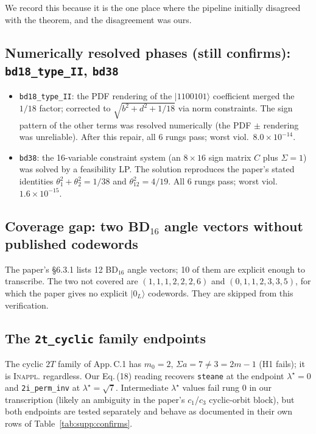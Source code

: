\documentclass[11pt]{article}
\newcommand{\vINAP}{\textcolor{cInapp}{\textsc{Inappl.}}}
\newcommand{\enot}[2]{\ensuremath{#1\!\times\!10^{#2}}}
\begin{document}
We record this because it is the one place where the pipeline initially
disagreed with the theorem, and the disagreement was ours.

\subsection{Numerically resolved phases (still confirms):
\texttt{bd18\_type\_II}, \texttt{bd38}}

\begin{itemize}[leftmargin=2em]
\item \texttt{bd18\_type\_II}: the PDF rendering of the $|1100101\rangle$
coefficient merged the $1/18$ factor; corrected to
$\sqrt{b^2+d^2+1/18}$ via norm constraints. The sign pattern of the other
terms was resolved numerically (the PDF $\pm$ rendering was unreliable).
After this repair, all 6 rungs pass; worst viol.\ \enot{8.0}{-14}.
\item \texttt{bd38}: the 16-variable constraint system (an $8\times16$ sign
matrix $C$ plus $\Sigma=1$) was solved by a feasibility LP. The solution
reproduces the paper's stated identities $\theta_1^2 + \theta_2^2 = 1/38$ and
$\theta_{12}^2 = 4/19$.  All 6 rungs pass; worst viol.\ \enot{1.6}{-15}.
\end{itemize}

\subsection{Coverage gap: two BD$_{16}$ angle vectors without published codewords}

The paper's \S 6.3.1 lists 12 BD$_{16}$ angle vectors; 10 of them are explicit
enough to transcribe. The two not covered are
$(1,1,1,2,2,2,6)$ and $(0,1,1,2,3,3,5)$, for which the paper gives no
explicit $|0_L\rangle$ codewords. They are skipped from this verification.

\subsection{The \texttt{2t\_cyclic} family endpoints}

The cyclic $2T$ family of App.\,C.1 has $m_0=2$, $\Sigma a = 7 \ne 3 = 2m{-}1$
(H1 fails); it is \vINAP{} regardless. Our Eq.\,(18) reading recovers
\texttt{steane} at the endpoint $\lambda^\star = 0$ and \texttt{2i\_perm\_inv}
at $\lambda^\star = \sqrt7$. Intermediate $\lambda^\star$ values fail rung 0
in our transcription (likely an ambiguity in the paper's $c_1$/$c_3$
cyclic-orbit block), but both endpoints are tested separately and behave as
documented in their own rows of Table~\ref{tab:supp:confirms}.
\end{document}

